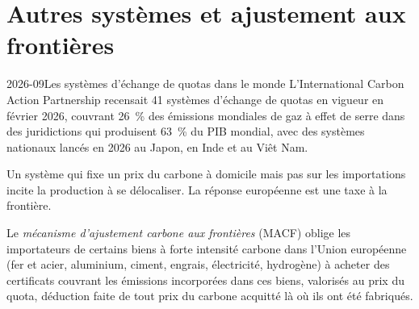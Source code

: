 \begin{omfigure}

\label{fig:m3:emissions-and-environmental-markets:switch}
\end{omfigure}

\section{Autres systèmes et ajustement aux frontières}

\begin{dated}{2026-09}{Les systèmes d'échange de quotas dans le monde}\label{dat:m3:emissions-and-environmental-markets:world}
L'International Carbon Action Partnership recensait 41 systèmes d'échange de quotas en vigueur en
février 2026, couvrant 26~\% des émissions mondiales de gaz à effet de serre dans des juridictions qui
produisent 63~\% du PIB mondial, avec des systèmes nationaux lancés en 2026 au Japon, en Inde et au Viêt Nam.
\end{dated}

Un système qui fixe un prix du carbone à domicile mais pas sur les importations incite la production à
se délocaliser. La réponse européenne est une taxe à la frontière.

\begin{definition}\label{def:m3:emissions-and-environmental-markets:cbam}
Le \emph{mécanisme d'ajustement carbone aux frontières} (MACF)
oblige les importateurs de certains biens à forte intensité carbone dans l'Union européenne (fer et acier,
aluminium, ciment, engrais, électricité, hydrogène) à acheter des certificats couvrant les émissions incorporées
dans ces biens, valorisés au prix du quota, déduction faite de tout prix du carbone acquitté là où ils ont été fabriqués.
\end{definition}

